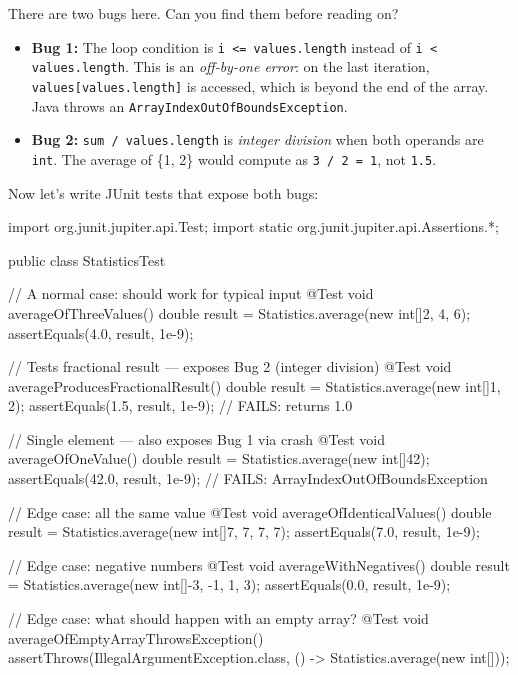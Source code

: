 \documentclass[11pt,letterpaper]{article}
\begin{document}
There are two bugs here. Can you find them before reading on?

\begin{itemize}[itemsep=3pt]
    \item \textbf{Bug 1:} The loop condition is \texttt{i <= values.length} instead of \texttt{i < values.length}. This is an \textit{off-by-one error}: on the last iteration, \texttt{values[values.length]} is accessed, which is beyond the end of the array. Java throws an \texttt{ArrayIndexOutOfBoundsException}.
    \item \textbf{Bug 2:} \texttt{sum / values.length} is \textit{integer division} when both operands are \texttt{int}. The average of \{1, 2\} would compute as \texttt{3 / 2 = 1}, not \texttt{1.5}.
\end{itemize}

Now let's write JUnit tests that expose both bugs:

\begin{javacode}
import org.junit.jupiter.api.Test;
import static org.junit.jupiter.api.Assertions.*;

public class StatisticsTest {

    // A normal case: should work for typical input
    @Test
    void averageOfThreeValues() {
        double result = Statistics.average(new int[]{2, 4, 6});
        assertEquals(4.0, result, 1e-9);
    }

    // Tests fractional result --- exposes Bug 2 (integer division)
    @Test
    void averageProducesFractionalResult() {
        double result = Statistics.average(new int[]{1, 2});
        assertEquals(1.5, result, 1e-9);  // FAILS: returns 1.0
    }

    // Single element --- also exposes Bug 1 via crash
    @Test
    void averageOfOneValue() {
        double result = Statistics.average(new int[]{42});
        assertEquals(42.0, result, 1e-9); // FAILS: ArrayIndexOutOfBoundsException
    }

    // Edge case: all the same value
    @Test
    void averageOfIdenticalValues() {
        double result = Statistics.average(new int[]{7, 7, 7, 7});
        assertEquals(7.0, result, 1e-9);
    }

    // Edge case: negative numbers
    @Test
    void averageWithNegatives() {
        double result = Statistics.average(new int[]{-3, -1, 1, 3});
        assertEquals(0.0, result, 1e-9);
    }

    // Edge case: what should happen with an empty array?
    @Test
    void averageOfEmptyArrayThrowsException() {
        assertThrows(IllegalArgumentException.class,
                     () -> Statistics.average(new int[]{}));
    }
}
\end{javacode}
\end{document}

